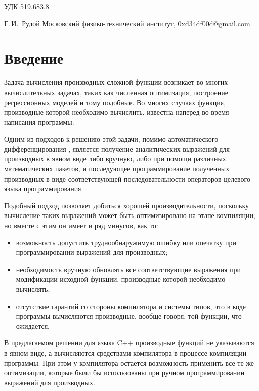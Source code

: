 \documentclass[11pt,a4paper]{article}
\begin{document}
УДК 519.683.8
\begin{center}

  \bigskip
  Г.\,И.~Рудой
  Московский физико-технический институт, 0xd34df00d@gmail.com
\end{center}

\section{Введение}

Задача вычисления производных сложной функции возникает во многих вычислительных
задачах, таких как численная оптимизация, построение регрессионных моделей
\cite{Rudoy16StabilityAnalysis} и тому подобные. Во многих случаях функция,
производные которой необходимо вычислить, известна наперед во время написания
программы.

Одним из подходов к решению этой задачи, помимо автоматического дифференцирования \cite{Neidinger2010Introduction},
является получение аналитических выражений для производных в явном виде либо вручную,
либо при помощи различных математических пакетов, и последующее программирование
полученных производных в виде соответствующей последовательности операторов целевого
языка программирования.

Подобный подход позволяет добиться хорошей производительности, поскольку вычисление
таких выражений может быть оптимизировано на этапе компиляции, но вместе с этим он
имеет и ряд минусов, как то:
\begin{itemize}
  \item возможность допустить труднообнаружимую ошибку или опечатку при
	программировании выражений для производных;
  \item необходимость вручную обновлять все соответствующие выражения при модификации
	исходной функции, производные которой необходимо вычислять;
  \item отсутствие гарантий со стороны компилятора и системы типов, что в коде
	программы вычисляются производные, вообще говоря, той функции, что ожидается.
\end{itemize}

В предлагаемом решении для языка C++ производные функций не указываются в явном виде,
а вычисляются средствами компилятора в процессе компиляции программы. При этом у
компилятора остается возможность применить все те же оптимизации, которые были бы
использованы при ручном программировании выражений для производных.
\end{document}
